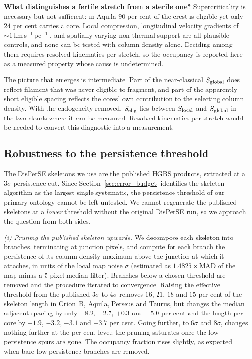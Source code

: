 \documentclass[usenatbib,twoside,twocolumn]{mnras}
\begin{document}
\smallskip\noindent\textbf{What distinguishes a fertile stretch from a sterile one?} Supercriticality is necessary but not sufficient: in Aquila $90$ per cent of the crest is eligible yet only $24$ per cent carries a core. Local compression, longitudinal velocity gradients of $\sim1$\,km\,s$^{-1}$\,pc$^{-1}$ \citep{Kirk2013,Hacar2013}, and spatially varying non-thermal support are all plausible controls, and none can be tested with column density alone. Deciding among them requires resolved kinematics per stretch, so the occupancy is reported here as a measured property whose cause is undetermined.

The picture that emerges is intermediate. Part of the near-classical $S_{\rm global}$ does reflect filament that was never eligible to fragment, and part of the apparently short eligible spacing reflects the cores' own contribution to the selecting column density. With the endogeneity removed, $S_{\rm elig}$ lies between $S_{\rm local}$ and $S_{\rm global}$ in the two clouds where it can be measured. Resolved kinematics per stretch would be needed to convert this diagnostic into a measurement.

\subsection{Robustness to the persistence threshold}
\label{sec:persistence}

The DisPerSE skeletons we use are the published HGBS products, extracted at a $3\sigma$ persistence cut. Since Section~\ref{sec:error_budget} identifies the skeleton algorithm as the largest single systematic, the persistence threshold of our primary ontology cannot be left untested. We cannot regenerate the published skeletons at a \emph{lower} threshold without the original DisPerSE run, so we approach the question from both sides.

\smallskip\noindent\emph{(i) Pruning the published skeleton upwards.} We decompose each skeleton into branches, terminating at junction pixels, and compute for each branch the persistence of its column-density maximum above the junction at which it attaches, in units of the local map noise $\sigma$ (estimated as $1.4826\times$MAD of the map minus a $5$-pixel median filter). Branches below a chosen threshold are removed and the procedure iterated to convergence. Raising the effective threshold from the published $3\sigma$ to $4\sigma$ removes $16$, $21$, $18$ and $15$ per cent of the skeleton length in Orion~B, Aquila, Perseus and Taurus, but changes the median adjacent spacing by only $-8.2$, $-2.7$, $+0.3$ and $-5.0$ per cent and the length per core by $-1.9$, $-3.2$, $-3.1$ and $-3.7$ per cent. Going further, to $6\sigma$ and $8\sigma$, changes nothing further at the per-cent level: the pruning saturates once the low-persistence spurs are gone. The occupancy fraction rises slightly, as expected when bare low-persistence branches are removed.
\end{document}
